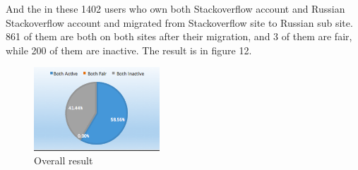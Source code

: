 \documentclass[A4paper,twoside,twocolumn]{article}
\begin{document}
And the in these 1402 users who own both Stackoverflow account and Russian Stackoverflow account and migrated from Stackoverflow site to Russian sub site. 861 of them are both on both sites after their migration, and 3 of them are fair, while 200 of them are inactive. The result is in figure 12.
	\begin{figure}[H]
		\includegraphics[width = 0.42\textwidth]{useractivity_post2.png}
		\caption{Overall result}
  	\end{figure}
  	
  	
  	
\end{document}
